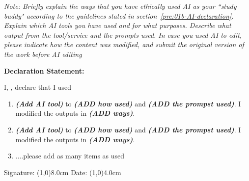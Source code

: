 \textit{Note: Briefly explain the ways that you have ethically used AI as your ``study buddy" according to the guidelines stated in section~\ref{pre:01b-AI-declaration}. Explain which AI tools you have used and for what purposes. Describe what output from the tool/service and the prompts used. In case you used AI to edit, please indicate how the content was modified, and submit the original version of the work before AI editing}

\textbf{Declaration Statement:}

I, \theStudentName, declare that I used 
\begin{enumerate}[label=\roman*.]
    \item \textit{\textbf{(Add AI tool)}}  to \textit{\textbf{(ADD how used)}} and \textit{\textbf{(ADD the prompst used)}}. I modified the outputs in \textit{\textbf{(ADD ways)}}.

    
    \item \textit{\textbf{(Add AI tool)}}  to \textit{\textbf{(ADD how used)}} and \textit{\textbf{(ADD the prompst used)}}. I modified the outputs in \textit{\textbf{(ADD ways)}}.
    \item ....please add as many items as used
\end{enumerate}


\vspace{1cm}

Signature: \line(1,0){8.0cm}
Date:	\line(1,0){4.0cm}\par